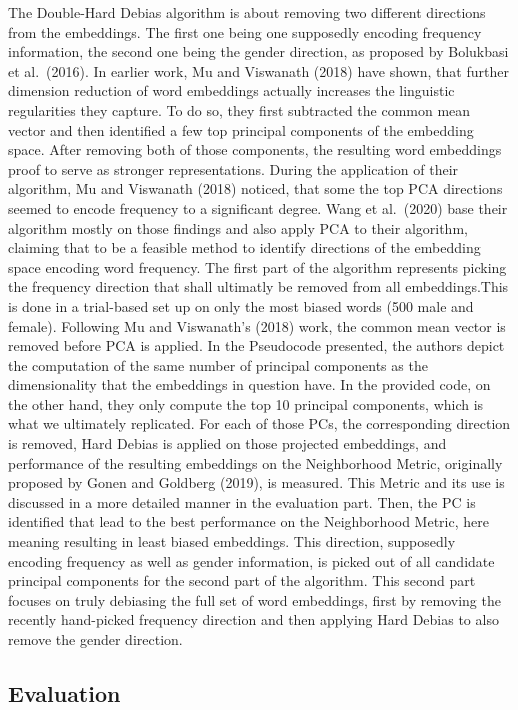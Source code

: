 \documentclass[
  english,
  man,floatsintext]{apa6}
\begin{document}
The Double-Hard Debias algorithm is about removing two different directions from the embeddings. The first one being one supposedly encoding frequency information, the second one being the gender direction, as proposed by Bolukbasi et al.~(2016).
In earlier work, Mu and Viswanath (2018) have shown, that further dimension reduction of word embeddings actually increases the linguistic regularities they capture. To do so, they first subtracted the common mean vector and then identified a few top principal components of the embedding space. After removing both of those components, the resulting word embeddings proof to serve as stronger representations. During the application of their algorithm, Mu and Viswanath (2018) noticed, that some the top PCA directions seemed to encode frequency to a significant degree.
Wang et al.~(2020) base their algorithm mostly on those findings and also apply PCA to their algorithm, claiming that to be a feasible method to identify directions of the embedding space encoding word frequency.
The first part of the algorithm represents picking the frequency direction that shall ultimatly be removed from all embeddings.This is done in a trial-based set up on only the most biased words (500 male and female). Following Mu and Viswanath's (2018) work, the common mean vector is removed before PCA is applied.
In the Pseudocode presented, the authors depict the computation of the same number of principal components as the dimensionality that the embeddings in question have. In the provided code, on the other hand, they only compute the top 10 principal components, which is what we ultimately replicated.
For each of those PCs, the corresponding direction is removed, Hard Debias is applied on those projected embeddings, and performance of the resulting embeddings on the Neighborhood Metric, originally proposed by Gonen and Goldberg (2019), is measured. This Metric and its use is discussed in a more detailed manner in the evaluation part.
Then, the PC is identified that lead to the best performance on the Neighborhood Metric, here meaning resulting in least biased embeddings.
This direction, supposedly encoding frequency as well as gender information, is picked out of all candidate principal components for the second part of the algorithm.
This second part focuses on truly debiasing the full set of word embeddings, first by removing the recently hand-picked frequency direction and then applying Hard Debias to also remove the gender direction.

\hypertarget{evaluation}{%
\subsection{Evaluation}\label{evaluation}}
\end{document}
